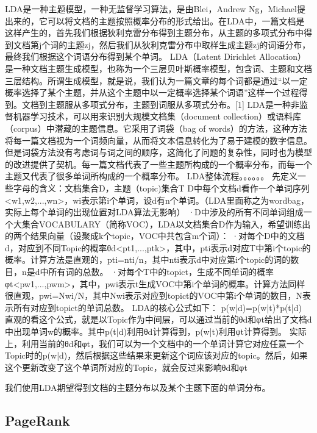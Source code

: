 \documentclass[master]{njuthesis}
\begin{document}
LDA是一种主题模型，一种无监督学习算法，是由Blei，Andrew Ng，Michael提出来的，它可以将文档的主题按照概率分布的形式给出。在LDA中，一篇文档是这样产生的，首先我们根据狄利克雷分布得到主题分布，从主题的多项式分布中得到文档第j个词的主题zj，然后我们从狄利克雷分布中取样生成主题zj的词语分布，最终我们根据这个词语分布得到某个单词。
LDA（Latent Dirichlet Allocation）是一种文档主题生成模型，也称为一个三层贝叶斯概率模型，包含词、主题和文档三层结构。所谓生成模型，就是说，我们认为一篇文章的每个词都是通过“以一定概率选择了某个主题，并从这个主题中以一定概率选择某个词语”这样一个过程得到。文档到主题服从多项式分布，主题到词服从多项式分布。[1] 
LDA是一种非监督机器学习技术，可以用来识别大规模文档集（document collection）或语料库（corpus）中潜藏的主题信息。它采用了词袋（bag of words）的方法，这种方法将每一篇文档视为一个词频向量，从而将文本信息转化为了易于建模的数字信息。但是词袋方法没有考虑词与词之间的顺序，这简化了问题的复杂性，同时也为模型的改进提供了契机。每一篇文档代表了一些主题所构成的一个概率分布，而每一个主题又代表了很多单词所构成的一个概率分布。
LDA整体流程。。。。。。
先定义一些字母的含义：文档集合D，主题（topic)集合T
D中每个文档d看作一个单词序列<w1,w2,...,wn>，wi表示第i个单词，设d有n个单词。（LDA里面称之为wordbag，实际上每个单词的出现位置对LDA算法无影响）
·D中涉及的所有不同单词组成一个大集合VOCABULARY（简称VOC），LDA以文档集合D作为输入，希望训练出的两个结果向量（设聚成k个topic，VOC中共包含m个词）：
·对每个D中的文档d，对应到不同Topic的概率θd<pt1,...,ptk>，其中，pti表示d对应T中第i个topic的概率。计算方法是直观的，pti=nti/n，其中nti表示d中对应第i个topic的词的数目，n是d中所有词的总数。
·对每个T中的topict，生成不同单词的概率φt<pw1,...,pwm>，其中，pwi表示t生成VOC中第i个单词的概率。计算方法同样很直观，pwi=Nwi/N，其中Nwi表示对应到topict的VOC中第i个单词的数目，N表示所有对应到topict的单词总数。
LDA的核心公式如下：
p(w|d)=p(w|t)*p(t|d)
直观的看这个公式，就是以Topic作为中间层，可以通过当前的θd和φt给出了文档d中出现单词w的概率。其中p(t|d)利用θd计算得到，p(w|t)利用φt计算得到。
实际上，利用当前的θd和φt，我们可以为一个文档中的一个单词计算它对应任意一个Topic时的p(w|d)，然后根据这些结果来更新这个词应该对应的topic。然后，如果这个更新改变了这个单词所对应的Topic，就会反过来影响θd和φt

我们使用LDA期望得到文档的主题分布以及某个主题下面的单词分布。

\subsection{PageRank}
\end{document}
